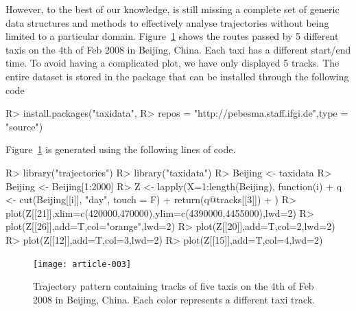 \documentclass[article]{jss}
\begin{document}
However, to the best of our knowledge,  is still missing a complete set of generic data structures and methods to effectively analyse trajectories without being limited to a particular domain. Figure~\ref{taxitracks} shows the routes passed by 5 different taxis on the 4th of Feb 2008 in Beijing, China. Each taxi has a different start/end time. To avoid having a complicated plot, we have only displayed 5 tracks. The entire dataset is stored in the  package    that can be installed through the following code
\begin{Sinput}
R>   install.packages("taxidata", 
R>   repos = "http://pebesma.staff.ifgi.de",type = "source") 
\end{Sinput}

Figure~\ref{taxitracks} is generated using the following lines of code.


\begin{Sinput}
R> library("trajectories")
R> library("taxidata")
R> Beijing <- taxidata
R> Beijing <- Beijing[1:2000]
R> Z <- lapply(X=1:length(Beijing), function(i){
+    q <-  cut(Beijing[[i]], "day", touch = F)
+    return(q@tracks[[3]])
+  })
R> plot(Z[[21]],xlim=c(420000,470000),ylim=c(4390000,4455000),lwd=2)
R> plot(Z[[26]],add=T,col="orange",lwd=2)
R> plot(Z[[20]],add=T,col=2,lwd=2)
R> plot(Z[[12]],add=T,col=3,lwd=2)
R> plot(Z[[15]],add=T,col=4,lwd=2)
\end{Sinput}
\begin{figure}[!h]
\begin{center}
\texttt{[image: article-003]}
\end{center}
\caption{Trajectory pattern containing tracks of five taxis on the 4th of Feb 2008 in Beijing, China. Each color represents a different taxi track.}
\label{taxitracks}
\end{figure}
\end{document}
